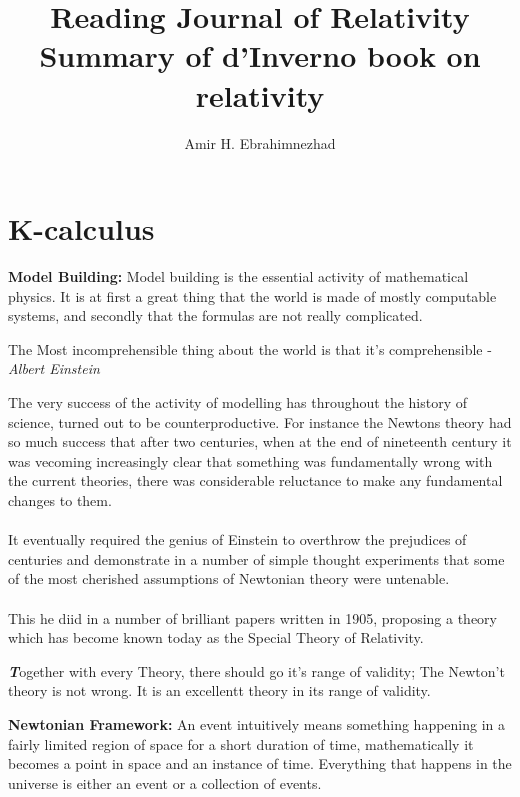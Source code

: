 \documentclass[10pt,a4paper,twocolumn]{article}
\title{Reading Journal of Relativity \\ \large Summary of d'Inverno book on relativity}
\author{Amir H. Ebrahimnezhad}
\date{}
\newcounter{theo}
\newenvironment{callout}
	{\begin{calloutbox}\color{charcoal}\textbf\textit}
	{\end{calloutbox}}
\begin{document}
          \maketitle
          \tableofcontents
          \section{K-calculus}
               \textbf{Model Building:} Model building is the essential activity of mathematical physics. It is at first a great thing that the world is made of mostly computable systems, and secondly that the formulas are not really complicated.
               \begin{qt}
                    The Most incomprehensible thing about the world is that it's comprehensible - \textit{Albert Einstein}
               \end{qt}
               \indent The very success of the activity of modelling has throughout the history of science, turned out to be counterproductive. For instance the Newtons theory had so much success that after two centuries, when at the end of nineteenth century it was vecoming increasingly clear that something was fundamentally wrong with the current theories, there was considerable reluctance to make any fundamental changes to them.
               \\
               \\
               \indent It eventually required the genius of Einstein to overthrow the prejudices of centuries and demonstrate in a number of simple thought experiments that some of the most cherished assumptions of Newtonian theory were untenable.
               \\
               \\
               \indent This he diid in a number of brilliant papers written in 1905, proposing a theory which has become known today as the Special Theory of Relativity.
               \begin{callout}
                    Together with every Theory, there should go it's range of validity; The Newton't theory is not wrong. It is an excellentt theory in its range of validity.
               \end{callout}
               \textbf{Newtonian Framework: } An event intuitively means something happening in a fairly limited region of space for a short duration of time, mathematically it becomes a point in space and an instance of time. Everything that happens in the universe is either an event or a collection of events.
\end{document}
